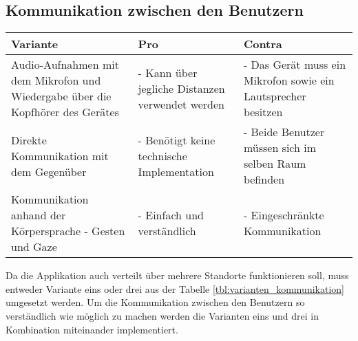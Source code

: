 \subsection{Kommunikation zwischen den Benutzern}
\begin{center}
	\begin{tabularx} {\textwidth} { |X|X|X| }
		\hline
		\rowcolor{black}
		\color{white} \textbf{Variante} & \color{white} \textbf{Pro} & 
		\color{white} \textbf{Contra} \\
		\hline
		Audio-Aufnahmen mit dem Mikrofon und Wiedergabe über die Kopfhörer des Gerätes & - Kann über jegliche Distanzen verwendet werden & - Das Gerät muss ein Mikrofon sowie ein Lautsprecher besitzen \\
		\hline
		Direkte Kommunikation mit dem Gegenüber & - Benötigt keine technische Implementation & - Beide Benutzer müssen sich im selben Raum befinden \\
		\hline
		Kommunikation anhand der Körpersprache - Gesten und Gaze & - Einfach und verständlich & - Eingeschränkte Kommunikation \\
		\hline	
	\end{tabularx}
\end{center}
\label{tbl:varianten_kommunikation}

Da die Applikation auch verteilt über mehrere Standorte funktionieren soll, muss entweder Variante eins oder drei aus der Tabelle \ref{tbl:varianten_kommunikation} umgesetzt werden. Um die Kommunikation zwischen den Benutzern so verständlich wie möglich zu machen werden die Varianten eins und drei in Kombination miteinander implementiert.

